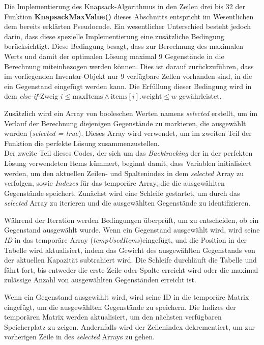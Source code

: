 Die Implementierung des Knapsack-Algorithmus in den Zeilen drei bis 32 der Funktion \textbf{KnapsackMaxValue()} dieses
Abschnitts entspricht im Wesentlichen dem bereits erklärten Pseudocode. Ein wesentlicher Unterschied besteht jedoch darin,
dass diese spezielle Implementierung eine zusätzliche Bedingung berücksichtigt. Diese Bedingung besagt, dass zur Berechnung
des maximalen Werts und damit der optimalen Lösung maximal 9 Gegenstände in die Berechnung miteinbezogen werden können.
Dies ist darauf zurückzuführen, dass im vorliegenden Inventar-Objekt nur 9 verfügbare Zellen vorhanden sind, in die ein
Gegenstand eingefügt werden kann. Die Erfüllung dieser Bedingung wird in dem
\textit{else-if}-Zweig $i \leq \text{maxItems} \land \text{items}[i].\text{weight} \leq w$ gewährleistet.

Zusätzlich wird ein Array von booleschen Werten namens \textit{selected} erstellt, um im Verlauf der Berechnung diejenigen
Gegenstände zu markieren, die ausgewählt wurden (\textit{selected = true}). Dieses Array wird verwendet, um im zweiten
Teil der Funktion die perfekte Lösung zusammenzustellen.\\

Der zweite Teil dieses Codes, der sich um das \textit{Backtracking} der in der perfekten Lösung verwendeten Items kümmert,
beginnt damit, dass Variablen initialisiert werden, um den aktuellen Zeilen- und Spaltenindex in dem \textit{selected}
Array zu verfolgen, sowie \textit{Indezes} für das temporäre Array, die die ausgewählten Gegenstände speichert. Zunächst
wird eine Schleife gestartet, um durch das \textit{selected} Array
zu iterieren und die ausgewählten Gegenstände zu identifizieren.

Während der Iteration werden Bedingungen überprüft, um zu entscheiden, ob ein Gegenstand ausgewählt wurde. Wenn ein
Gegenstand ausgewählt wird, wird seine \textit{ID} in das temporäre Array (\textit{tempUsedItems})eingefügt, und die
Position in der Tabelle wird aktualisiert, indem das Gewicht des ausgewählten Gegenstands von der aktuellen Kapazität
subtrahiert wird. Die Schleife durchläuft die Tabelle und fährt fort, bis entweder die erste Zeile oder Spalte erreicht
wird oder die maximal zulässige Anzahl von ausgewählten Gegenständen erreicht ist.

Wenn ein Gegenstand ausgewählt wird, wird seine ID in die temporäre Matrix eingefügt, um die ausgewählten Gegenstände zu
speichern. Die Indizes der temporären Matrix werden aktualisiert, um den nächsten verfügbaren Speicherplatz zu zeigen.
Andernfalls wird der Zeilenindex dekrementiert, um zur vorherigen Zeile in des \textit{selected} Arrays zu gehen.

